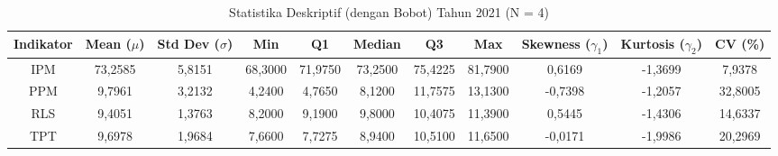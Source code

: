 \begin{table}[H]
\centering
\caption{Statistika Deskriptif (dengan Bobot) Tahun 2021 (N = 4)} \label{tab:sample1desc_2021}
\begin{adjustbox}{max width=\textwidth, max height=0.85\textheight}
\begin{tabular}{|c|c|c|c|c|c|c|c|c|c|c|}
\hline
\textbf{Indikator} & \textbf{Mean ($\mu$)} & \textbf{Std Dev ($\sigma$)} & \textbf{Min} & \textbf{Q1} & \textbf{Median} & \textbf{Q3} & \textbf{Max} & \textbf{Skewness ($\gamma_1$)} & \textbf{Kurtosis ($\gamma_2$)} & \textbf{CV (\%)} \\
\hline
IPM & 73,2585 & 5,8151 & 68,3000 & 71,9750 & 73,2500 & 75,4225 & 81,7900 & 0,6169 & -1,3699 & 7,9378 \\
PPM & 9,7961 & 3,2132 & 4,2400 & 4,7650 & 8,1200 & 11,7575 & 13,1300 & -0,7398 & -1,2057 & 32,8005 \\
RLS & 9,4051 & 1,3763 & 8,2000 & 9,1900 & 9,8000 & 10,4075 & 11,3900 & 0,5445 & -1,4306 & 14,6337 \\
TPT & 9,6978 & 1,9684 & 7,6600 & 7,7275 & 8,9400 & 10,5100 & 11,6500 & -0,0171 & -1,9986 & 20,2969 \\
\hline
\end{tabular}
\end{adjustbox}
\end{table}